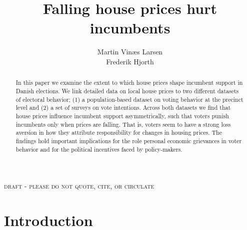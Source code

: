 \documentclass[12pt,a4paper]{article}
\title{ Falling house prices hurt incumbents  }
\author{
Martin Vinæs Larsen \\

Frederik Hjorth}
\begin{document}
\maketitle

\begin{center}
\textsc{draft - please do not quote, cite, or circulate}
\end{center}

\begin{abstract}
\noindent In this paper we examine the extent to which house prices shape incumbent support in Danish elections. We link detailed data on local house prices to two different datasets of electoral behavior;  (1)  a population-based dataset on voting behavior at the precinct level and (2) a set of surveys on vote intentions. Across both datasets we find that house prices influence incumbent support asymmetrically, such that voters punish incumbents only when prices are falling. That is, voters seem to have a strong loss aversion in how they attribute responsibility for changes in housing prices. The findings hold important implications for the role personal economic grievances in voter behavior and for the political incentives faced by policy-makers.
\end{abstract}



\newpage

\onehalfspacing

\section{Introduction}


\clearpage

\singlespacing



\end{document}
